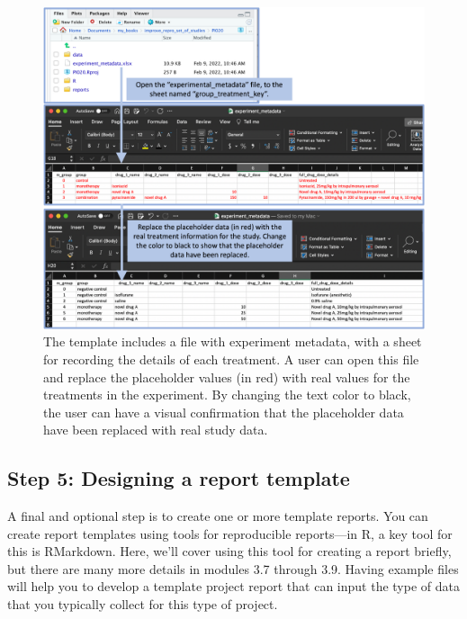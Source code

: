 \documentclass[]{tufte-book}
\begin{document}
\begin{figure}
\includegraphics[width=\textwidth]{figures/project_replacing_placeholder_treatment_data} \caption[The template includes a file with experiment metadata, with a sheet for recording the details of each treatment]{The template includes a file with experiment metadata, with a sheet for recording the details of each treatment. A user can open this file and replace the placeholder values (in red) with real values for the treatments in the experiment. By changing the text color to black, the user can have a visual confirmation that the placeholder data have been replaced with real study data.}\label{fig:replacingplaceholdertreatment2}
\end{figure}

\subsection{Step 5: Designing a report template}\label{step-5-designing-a-report-template}

A final and optional step is to create one or more template reports. You can
create report templates using tools for reproducible reports---in R, a key tool
for this is RMarkdown. Here, we'll cover using this tool for creating a report
briefly, but there are many more details in modules 3.7 through 3.9. Having
example files will help you to develop a template project report that can input
the type of data that you typically collect for this type of project.
\end{document}
